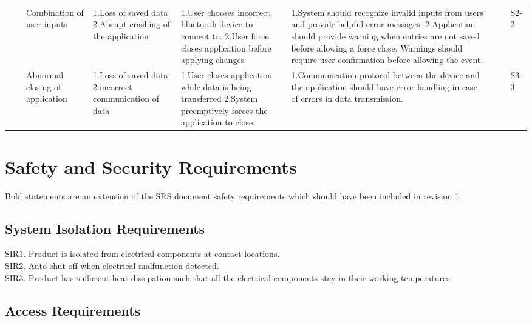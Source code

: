 \documentclass{article}
\begin{document}
\begin{table}[H]
\begin{tabular}{| p{} | p{}  | p{} | p{} | p{} | p{} | p{} | p{} | p{} |}
     & & Combination of user inputs & 1.Loss of saved data \newline 2.Abrupt crashing of the application  &  1.User chooses incorrect bluetooth device to connect to. \newline 2.User force closes application before applying changes  &  1.System should recognize invalid inputs from users and provide helpful error messages. \newline 2.Application should provide warning when entries are not saved before allowing a force close. Warnings should require user confirmation before allowing the event.  &  &  & S2-2 \\ \cline{3-9}

     & & Abnormal closing of application & 1.Loss of saved data \newline 2.incorrect communication of data  & 1.User closes application while data is being transferred \newline 2.System preemptively forces the application to close. & 1.Communication protocol between the device and the application should have error handling in case of errors in data transmission.  & & & S3-3 \\ \hline
    
    \end{tabular}
    \hspace*{-1cm}
    \end{table}

\newpage 
\section{Safety and Security Requirements}

Bold statements are an extension of the SRS document safety requirements which should have been included in revision 1.

\subsection{System Isolation Requirements}

SIR1. Product is isolated from electrical components at contact locations.
\\SIR2. Auto shut-off when electrical malfunction detected.
\\SIR3. Product has sufficient heat dissipation such that all the electrical components stay in their working temperatures.

\subsection{Access Requirements}
\end{document}
